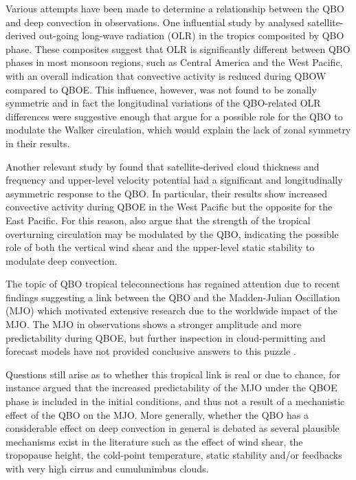 Various attempts have been made to determine a relationship between the QBO and deep convection in observations. 
One influential study by \cite{collimore2003} analysed satellite-derived out-going long-wave radiation (OLR) in the tropics composited by QBO phase. These composites suggest that OLR is significantly different between QBO phases in most monsoon regions, such as Central America  and the West Pacific, with an overall indication that convective activity is reduced during QBOW compared to QBOE. This influence, however, was not found to be zonally symmetric and in fact the longitudinal variations of the QBO-related OLR differences were suggestive enough that \cite{collimore2003} argue for a possible role for the QBO to modulate the Walker circulation, which would explain the lack of zonal symmetry in their results. 


Another relevant study by \cite{liess2012} found that satellite-derived cloud thickness and frequency  and upper-level velocity potential had a significant and longitudinally asymmetric response to the QBO. In particular, their results show increased convective activity during QBOE in the West Pacific but the opposite for the East Pacific.  For this reason, \cite{liess2012} also argue that the strength of the tropical overturning circulation may be modulated by the QBO, indicating the possible role of both the vertical wind shear and the upper-level static stability to modulate deep convection. 


The topic of QBO tropical teleconnections has regained attention due to recent findings suggesting a link between the QBO and the Madden-Julian Oscillation (MJO) \citep{son2017} which motivated extensive research \citep[see e.g.][]{lee2018,wang2019,martin2020jgr} due to the worldwide impact of the MJO.
 The MJO in observations shows a stronger amplitude and more predictability during QBOE, but further inspection in cloud-permitting and forecast models have not provided conclusive answers to this puzzle \citep{martin2019,martin2020jgr}. 
 
 Questions still arise as to whether this tropical link is real or due to chance, for instance \cite{wang2019} argued that the increased predictability of the MJO under the QBOE phase is included in the initial conditions, and thus not a result of a mechanistic effect of the QBO on the MJO. More generally, whether the QBO has a considerable effect on deep convection in general is debated as several plausible mechanisms exist in the literature \citep[see e.g.][]{nie2015} such as the effect of wind shear, the tropopause height, the cold-point temperature, static stability and/or feedbacks with very high cirrus and cumulunimbus clouds. 

